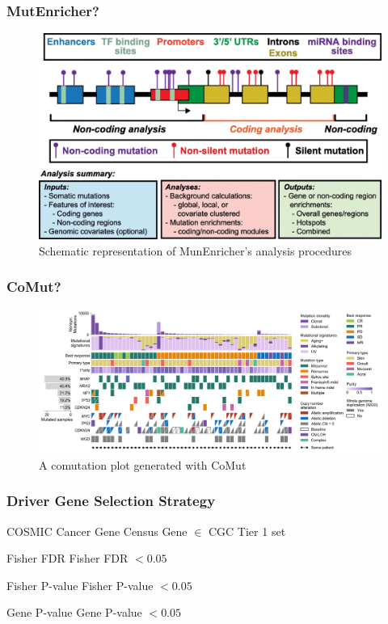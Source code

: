 \documentclass{beamer}
\begin{document}
    \begin{frame}
        \frametitle{MutEnricher?}

        \begin{figure}
            \includegraphics[width=0.8 \linewidth]{figures/Workflow/MutEnricher.jpg}
            \caption{Schematic representation of MunEnricher's analysis procedures \protect\cite{MutEnricher1}}
        \end{figure}
    \end{frame}

    \begin{frame}
        \frametitle{CoMut?}

        \begin{figure}
            \includegraphics[width=\linewidth]{figures/Workflow/comut.png}
            \caption{A comutation plot generated with CoMut \protect\cite{comut1}}
        \end{figure}
    \end{frame}

    \begin{frame}
        \frametitle{Driver Gene Selection Strategy}

        \begin{block}{COSMIC Cancer Gene Census \cite{CGC1}}
            Gene $\in$ CGC Tier 1 set
        \end{block}

        \begin{block}{Fisher FDR}
            Fisher FDR $ < 0.05$
        \end{block}

        \begin{block}{Fisher P-value}
            Fisher P-value $ < 0.05$
        \end{block}

        \begin{block}{Gene P-value}
            Gene P-value $ < 0.05 $
        \end{block}
    \end{frame}
\end{document}
